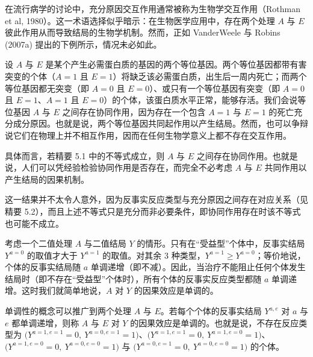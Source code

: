 \renewcommand{\FPname}{精要（Fine Point）}
\begin{finepoint}[生物学交互作用]
在流行病学的讨论中，充分原因交互作用通常被称为生物学交互作用（Rothman et al, 1980）。这一术语选择似乎暗示：在生物医学应用中，存在两个处理 $A$ 与 $E$ 彼此作用从而导致结局的生物学机制。然而，正如 VanderWeele 与 Robins (2007a) 提出的下例所示，情况未必如此。

设 $A$ 与 $E$ 是某个产生必需蛋白质的基因的两个等位基因。两个等位基因都带有害突变的个体（$A=1$ 且 $E=1$）将缺乏该必需蛋白质，出生后一周内死亡；而两个等位基因都无突变（即 $A=0$ 且 $E=0$）、或只有一个等位基因有突变（即 $A=0$ 且 $E=1$、$A=1$ 且 $E=0$）的个体，该蛋白质水平正常，能够存活。我们会说等位基因 $A$ 与 $E$ 之间存在协同作用，因为存在一个包含 $A=1$ 与 $E=1$ 的死亡充分成分原因。也就是说，两个等位基因共同起作用以产生结局。然而，也可以争辩说它们在物理上并不相互作用，因而在任何生物学意义上都不存在交互作用。
\end{finepoint}
\renewcommand{\FPname}{精要}

具体而言，若精要 5.1 中的不等式成立，则 $A$ 与 $E$ 之间存在协同作用。也就是说，人们可以凭经验检验协同作用是否存在，而完全不必考虑 $A$ 与 $E$ 共同作用以产生结局的因果机制。


这一结果并不太令人意外，因为反事实反应类型与充分原因之间存在对应关系（见精要 5.2），而且上述不等式只是充分而非必要条件，即协同作用存在时该不等式也可能不成立。

\renewcommand{\TPname}{技术注记（Technical Point）}
\begin{techpoint}[因果效应的单调性]
考虑一个二值处理 $A$ 与二值结局 $Y$ 的情形。只有在“受益型”个体中，反事实结局 $Y^{a=0}$ 的取值才大于 $Y^{a=1}$ 的取值。对其余 3 种类型，$Y^{a=1}\ge Y^{a=0}$；等价地说，个体的反事实结局随 $a$ 单调递增（即不减）。因此，当治疗不能阻止任何个体发生结局时（即不存在“受益型”个体时），所有个体的反事实反应类型都随 $a$ 单调递增。这时我们就简单地说，$A$ 对 $Y$ 的因果效应是单调的。

单调性的概念可以推广到两个处理 $A$ 与 $E$。若每个个体的反事实结局 $Y^{a,e}$ 对 $a$ 与 $e$ 都单调递增，则称 $A$ 与 $E$ 对 $Y$ 的因果效应是单调的。也就是说，不存在反应类型为 $\bigl(Y^{a=1,e=1}=0,\ Y^{a=0,e=1}=1\bigr)$、$\bigl(Y^{a=1,e=1}=0,\ Y^{a=1,e=0}=1\bigr)$、$\bigl(Y^{a=1,e=0}=0,\ Y^{a=0,e=0}=1\bigr)$ 与 $\bigl(Y^{a=0,e=1}=0,\ Y^{a=0,e=0}=1\bigr)$ 的个体。
\end{techpoint}
\renewcommand{\TPname}{技术注记}

